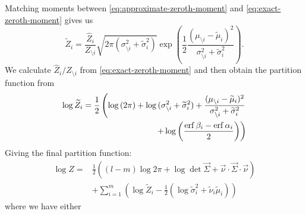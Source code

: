 \documentclass[11pt,twoside]{report}
\begin{document}
Matching moments between \eqref{eq:approximate-zeroth-moment} and \eqref{eq:exact-zeroth-moment} gives us
\begin{equation}
  \widetilde{Z}_i = \frac{\widehat{Z}_i}{Z_{\setminus i}}
  \sqrt{2 \pi (\sigma_{\setminus i}^2 + \widetilde{\sigma}_i^2)}
  \exp{\left(
    \frac{1}{2}
    \frac{(\mu_{\setminus i} - \widetilde{\mu}_i)^2}{\sigma_{\setminus i}^2 + \widetilde{\sigma}_i^2}
    \right)}.
\end{equation}
We calculate $\widehat{Z}_i / Z_{\setminus i}$ from \eqref{eq:exact-zeroth-moment} and then obtain the partition function from
\begin{equation}
  \begin{split}
    \log{\widetilde{Z}_i}
    =
    \frac{1}{2} \left(
    \log{(2\pi)} +
    \log{(\sigma_{\setminus i}^2 + \widetilde{\sigma}_i^2)} +
    \frac{(\mu_{\setminus i} - \widetilde{\mu}_i)^2}{\sigma_{\setminus i}^2 + \widetilde{\sigma}_i^2}
    \right.&
    \\
    \left.
    + \log{\left(\frac{\operatorname{erf}{\beta_i} - \operatorname{erf}{\alpha_i}}{2}\right)}
    \right)&
  \end{split}
\end{equation}
Giving the final partition function:
\begin{equation}
  \begin{split}
    \log{Z}
    =&
    \frac{1}{2} \left(
    (l-m) \log{2\pi}
    + \log\det{\vec{\Sigma}}
    + \vec{\nu} \cdot \vec{\Sigma} \cdot \vec{\nu}
    \right)
    \\ &
    + \sum_{i=1}^m \left(
    \log{\widetilde{Z}_i}
    - \frac{1}{2}
    \left(
    \log{\widetilde{\sigma}_i^2}
    + \widetilde{\nu}_i \widetilde{\mu}_i
    \right)
    \right)
  \end{split}
\end{equation}
where we have either
\end{document}
